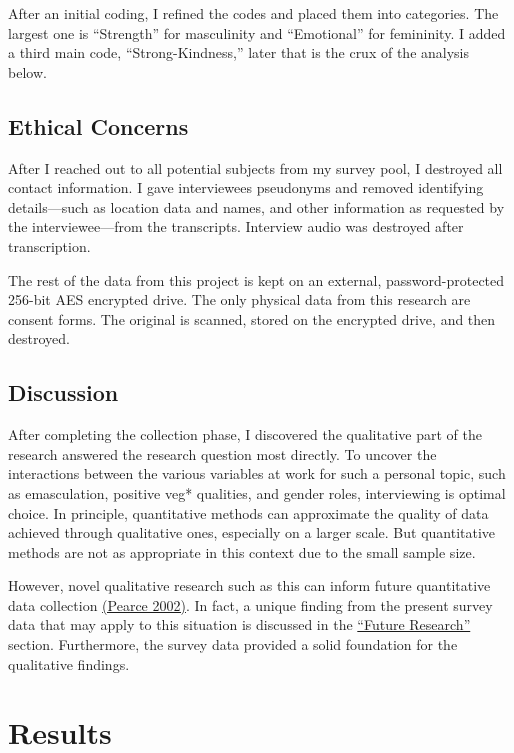 \documentclass[twoside]{report}
\let\oldsection\section
\renewcommand\section{\clearpage\oldsection}
\begin{document}
\begin{multicols}{2}
After an initial coding, I refined the codes and
placed them into categories. The largest one is ``Strength'' for
masculinity and ``Emotional'' for femininity. I added a third main code,
``Strong-Kindness,'' later that is the crux of the analysis below.

\subsection{Ethical Concerns}

After I reached out to all potential subjects from my survey pool, I
destroyed all contact information. I gave interviewees pseudonyms and removed identifying details---such as location data and names, and
other information as requested by the interviewee---from the
transcripts. Interview audio was destroyed after transcription.

The rest of the data from this project is kept on an external, password-protected 256-bit AES encrypted drive. The only physical data from this research are consent forms. The original is scanned, stored on the encrypted drive, and then destroyed.

\subsection{Discussion}

After completing the collection phase, I discovered the qualitative part
of the research answered the research question most directly. To uncover
the interactions between the various variables at work for such a
personal topic, such as emasculation, positive veg* qualities, and
gender roles, interviewing is optimal choice. In principle, quantitative
methods can approximate the quality of data achieved through qualitative
ones, especially on a larger scale. But quantitative methods are not as
appropriate in this context due to the small sample size.

However, novel qualitative research such as this can inform future
quantitative data collection \hyperlink{pearce}{(Pearce 2002)}. In fact, a unique finding from the present survey data that may apply to this situation is discussed in the \hyperlink{future-research}{``Future Research''} section. Furthermore, the survey data provided a solid foundation for the qualitative findings.

\section{Results}

\end{multicols}
\end{document}
